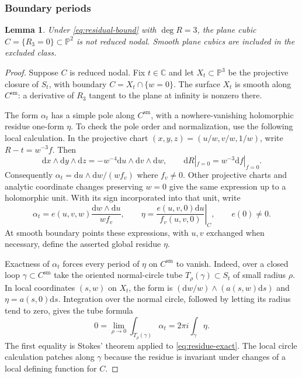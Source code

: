 \documentclass[11pt,reqno]{amsart}
\numberwithin{equation}{section}
\theoremstyle{plain}
\newtheorem{lemma}[theorem]{Lemma}
\theoremstyle{definition}
\theoremstyle{remark}
\newcommand{\C}{\mathbb C}
\newcommand{\PP}{\mathbb P}
\newcommand{\dd}{\mathrm d}
\begin{document}
\subsubsection{Boundary periods}
\begin{lemma}\label{lem:nodal-excluded}
Under \eqref{eq:residual-bound} with $\deg R=3$, the plane cubic $C=\{R_3=0\}\subset\PP^2$ is not reduced nodal. Smooth plane cubics are included in the excluded class.
\end{lemma}
\begin{proof}
Suppose $C$ is reduced nodal. Fix $t\in\C$ and let $X_t\subset\PP^3$ be the projective closure of $S_t$, with boundary $C=X_t\cap\{w=0\}$.
The surface $X_t$ is smooth along $C^{\mathrm{sm}}$: a derivative of $R_3$ tangent to the plane at infinity is nonzero there.

The form $\alpha_t$ has a simple pole along $C^{\mathrm{sm}}$, with a nowhere-vanishing holomorphic residue one-form $\eta$.
To check the pole order and normalization, use the following local calculation.
In the projective chart $(x,y,z)=(u/w,v/w,1/w)$, write $R-t=w^{-3}f$.
Then
\[
\dd x\wedge\dd y\wedge\dd z
=-w^{-4}\dd u\wedge\dd v\wedge\dd w,
\qquad
\dd R|_{f=0}=w^{-3}\dd f|_{f=0}.
\]
Consequently $\alpha_t=\dd u\wedge\dd w/(wf_v)$ where $f_v\ne0$.
Other projective charts and analytic coordinate changes preserving $w=0$ give the same expression up to a holomorphic unit. With its sign incorporated into that unit, write
\begin{equation}\label{eq:boundary-residue}
\alpha_t=e(u,v,w)\frac{\dd w\wedge\dd u}{wf_v},
\qquad
\eta=\left.\frac{e(u,v,0)\dd u}{f_v(u,v,0)}\right|_C,
\qquad e(0)\ne0.
\end{equation}
At smooth boundary points these expressions, with $u,v$ exchanged when necessary, define the asserted global residue $\eta$.

Exactness of $\alpha_t$ forces every period of $\eta$ on $C^{\mathrm{sm}}$ to vanish.
Indeed, over a closed loop $\gamma\subset C^{\mathrm{sm}}$ take the oriented normal-circle tube $T_\rho(\gamma)\subset S_t$ of small radius $\rho$.
In local coordinates $(s,w)$ on $X_t$, the form is $(\dd w/w)\wedge(a(s,w)\dd s)$ and $\eta=a(s,0)\dd s$.
Integration over the normal circle, followed by letting its radius tend to zero, gives the tube formula
\begin{equation}\label{eq:boundary-period}
0=\lim_{\rho\to0}\int_{T_\rho(\gamma)}\alpha_t
=2\pi i\int_\gamma\eta.
\end{equation}
The first equality is Stokes' theorem applied to \eqref{eq:residue-exact}. The local circle calculation patches along $\gamma$ because the residue is invariant under changes of a local defining function for $C$.


\end{proof}
\end{document}

